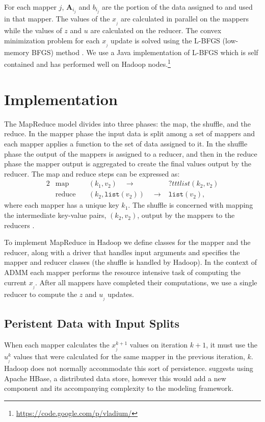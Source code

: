\documentclass[10pt, conference, compsocconf]{IEEEtran}
\begin{document}
For each mapper $j$, $\mathbf{A}_{i_j}$ and $b_{i_j}$ are the portion of the data assigned to and used in that mapper.  The values of the $x_{_j}$ are calculated in parallel on the mappers while the values of $z$ and $u$ are calculated on the reducer.  The convex minimization problem for each $x_{_j}$ update is solved using the L-BFGS (low-memory BFGS) method \cite{bonnans2003numerical}.  We use a Java implementation of L-BFGS which is self contained and has performed well on Hadoop nodes.\footnote{\url{https://code.google.com/p/vladium/}}

\section{Implementation}
The MapReduce model divides into three phases: the map, the shuffle, and the reduce.  In the mapper phase the input data is split among a set of mappers and each mapper applies a function to the set of data assigned to it.  In the shuffle phase the output of the mappers is assigned to a reducer, and then in the reduce phase the mapper output is aggregated to create the final values output by the reducer. The map and reduce steps can be expressed as:
\begin{alignat*}{2}
&\text{map}\quad &(k_1,v_2)\quad\rightarrow &\text{?}ttt{list}(k_2,v_2)\\
&\text{reduce}\quad &(k_2,\texttt{list}(v_2))\quad\rightarrow &\texttt{list}(v_2),
\end{alignat*}
where each mapper has a unique key $k_1$.  The shuffle is concerned with mapping the intermediate key-value pairs, $(k_2,v_2)$, output by the mappers to the reducers \cite{dean2004}.

To implement MapReduce in Hadoop we define classes for the mapper and the reducer, along with a driver that handles input arguments and specifies the mapper and reducer classes (the shuffle is handled by Hadoop).  In the context of ADMM each mapper performs the resource intensive task of computing the current $x_{_j}$.  After all mappers have completed their computations, we use a single reducer to compute the $z$ and $u_{_j}$ updates.

\subsection{Peristent Data with Input Splits}
When each mapper calculates the $x_{_j}^{k+1}$ values on iteration $k+1$, it must use the $u_{_j}^k$ values that were calculated for the same mapper in the previous iteration, $k$.  Hadoop does not normally accommodate this sort of persistence.  \cite{boyd} suggests using Apache HBase, a distributed data store, however this would add a new component and its accompanying complexity to the modeling framework.
\end{document}

